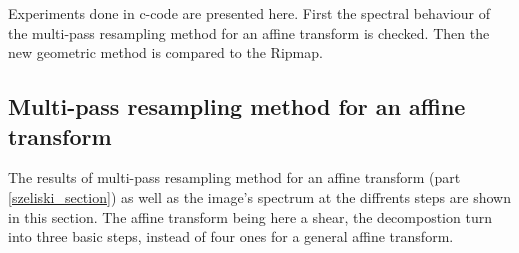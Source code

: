 	Experiments done in c-code are presented here. First the spectral behaviour of the multi-pass resampling method for an affine transform is checked. Then the new geometric method is compared to the Ripmap.


\subsection{Multi-pass resampling method for an affine transform}

 
 
 The results of multi-pass resampling method for an affine transform \cite{szeliski2010high} (part \ref{szeliski_section}) as well as the image's spectrum at the diffrents steps are shown in this section. The affine transform being here a shear, the decompostion turn into three basic steps, instead of four ones for a general affine transform.  
 
